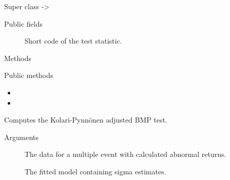 \documentclass[a4paper]{book}
\begin{document}
%
\begin{Section}{Super class}
 -> 
\end{Section}
%
\begin{Section}{Public fields}

\begin{description}

\item[] Short code of the test statistic.

\end{description}


\end{Section}
%
\begin{Section}{Methods}
%
\begin{SubSection}{Public methods}
\begin{itemize}

\item{} 
\item{} 

\end{itemize}

\end{SubSection}




\hypertarget{method-KolariPynnonenTest-compute}{}
%
\begin{SubSection}{}
Computes the Kolari-Pynnönen adjusted BMP test.
%

%
\begin{SubSubSection}{Arguments}

\begin{description}

\item[] The data for a multiple event with
calculated abnormal returns.
\item[] The fitted model containing sigma estimates.


\end{description}
\end{SubSubSection}
\end{SubSection}
\end{Section}
\end{document}
